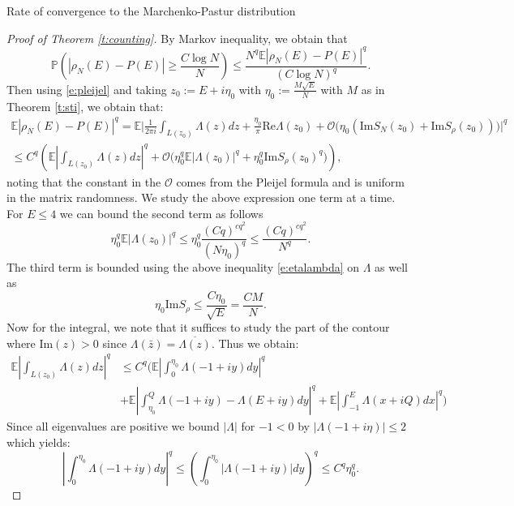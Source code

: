 \documentclass[11pt, a4paper, oneside]{book}
\numberwithin{equation}{chapter}
\newcommand{\E}{\mathbb E}
\newcommand{\PP}{\mathbb P}
\begin{document}
\begin{section}{Rate of convergence to the Marchenko-Pastur distribution}
\begin{proof}[Proof of Theorem \ref{t:counting}]
By Markov inequality, we obtain that
%
\begin{equation}
\PP\left(|\rho_N(E) - P(E)| \geq \frac{C \log N}{N}\right) \leq \frac{N^q\E \left |\rho_N(E) - P(E) \right |^q}{\left(C \log N\right)^q} .
\end{equation}
%
Then using \eqref{e:pleijel} and taking $z_0 := E + i\eta_0$ with $\eta_0 := \frac{M\sqrt E}{N}$ with $M$ as in Theorem \ref{t:sti}, we obtain that:
%
\begin{multline}
 \E \left |\rho_N(E) - P(E) \right |^q = \E \bigg |\frac{1}{2\pi i}\int_{L(z_0)}\Lambda(z)dz + \frac{\eta_0}{\pi} \mathrm{Re} \Lambda(z_0) + \mathcal{O}\bigg ( \eta_0  ( \mathrm{Im} S_N(z_0)+ \mathrm{Im} S_{\rho}(z_0)  ) \bigg ) \bigg |^q
\\
\leq  C^q\left(\E\left|\int_{L(z_0)}\Lambda(z) dz\right|^q + \mathcal{O} \bigg (\eta_0^q \E|\Lambda(z_0)|^q+\eta_0^q \mathrm{Im} S_{\rho}(z_0)^q \bigg )\right),
\end{multline}
%
noting that the constant in the $\mathcal{O}$ comes from the Pleijel formula and is uniform in the matrix randomness. We study the above expression one term at a time.
For $E \leq 4$ we can bound the second term as follows
%
\begin{equation}\label{e:etalambda}
 \eta_0^q \E|\Lambda(z_0)|^q \leq  \eta_0^q \frac{(Cq)^{cq^2}}{(N\eta_0 )^q} \leq \frac{(Cq)^{cq^2}}{N^q}.
\end{equation}
%
The third term is bounded using the above inequality \eqref{e:etalambda} on $\Lambda$ as well as
%
\begin{equation}\label{e:etaoverE}
\eta_0 \mathrm{Im} S_{\rho} \leq \frac{C\eta_0}{\sqrt E} = \frac{CM}{N}.
\end{equation}
%
Now for the integral, we note that it suffices to study the part of the contour where $\mathrm{Im} (z) > 0$ since $\Lambda(\bar z) = \overline{\Lambda( z)}$. Thus we obtain:
%
\begin{align*}
\E\left|\int_{L(z_0)}\Lambda(z) dz\right|^q &\leq C^q \bigg (\E \left|\int_0^{\eta_0} \Lambda(-1 + iy) dy \right|^q \\
&+\E \left|\int_{\eta_0}^Q \Lambda(-1 + iy) - \Lambda(E + iy)dy \right|^q+  \E \left|\int_{-1}^E  \Lambda(x + iQ) dx \right|^q \bigg )
\end{align*}
%
Since all eigenvalues are positive we bound $|\Lambda|$ for $-1<0$ by $|\Lambda(-1+i\eta)| \leq 2$ which yields:
%
\begin{equation}
\left|\int_0^{\eta_0} \Lambda(-1 + iy) dy \right|^q \leq \left(\int_0^{\eta_0} |\Lambda(-1 + iy)| dy \right)^q \leq C^q \eta_0^q.

\end{equation}
\end{proof}
\end{section}
\end{document}
